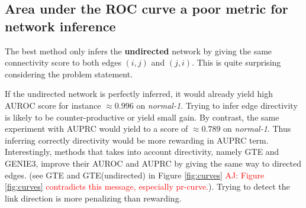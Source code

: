 \documentclass[wcp]{jmlr}
\begin{document}




\subsection*{Area under the ROC curve a poor metric for network inference}

The best method only infers the \textbf{undirected} network by giving the
same connectivity score to both edges $(i,j)$ and $(j,i)$. This is quite
surprising considering the problem statement.

If the undirected network is perfectly inferred, it would already yield
high AUROC score for instance $\approx{}0.996$ on \textit{normal-1}. Trying
to infer edge directivity is likely to be counter-productive or yield
small gain.
By contrast, the same experiment with AUPRC would yield
to a score of $\approx 0.789$ on \textit{normal-1}. Thus inferring
correctly directivity would be more rewarding in AUPRC term.
Interestingly, methods that takes into account directivity, namely GTE and
GENIE3, improve their AUROC and AUPRC by giving the same way to directed edges.
(see GTE and GTE(undirected) in Figure \ref{fig:curves}
\textcolor{red}{AJ: Figure \ref{fig:curves}  contradicts this message,
especially pr-curve.}).
Trying to detect the link direction is more penalizing than rewarding.
\end{document}
